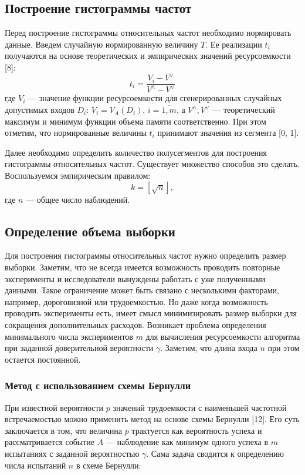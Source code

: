\subsection{Построение гистограммы частот}

Перед построение гистограммы относительных частот необходимо нормировать данные. Введем случайную нормированную величину $T$. Ее реализации $t_i$ получаются на основе теоретических и эмпирических значений ресурсоемкости [8]:
$$t_i = \frac{V_i - V^{\vee}}{V^{\wedge} - V^{\vee}}$$
где $V_i$ — значение функции ресурсоемкости для сгенерированных случайных допустимых входов $D_i$: $V_i = V_A(D_i)$, $i = \overline{1, m}$, а $V^{\wedge}, V^{\vee}$ — теоретический максимум и минимум функции объема памяти соответственно. При этом отметим, что
нормированные величины $t_i$ принимают значения из сегмента [0, 1].

Далее необходимо определить количество полусегментов для построения гистограммы относительных частот. Существует множество способов это сделать. Воспользуемся эмпирическим правилом:
$$k = [\sqrt{n}],$$
где $n$ — общее число наблюдений.

\subsection{Определение объема выборки}

Для построения гистограммы относительных частот нужно определить размер выборки. Заметим, что не всегда имеется возможность проводить повторные эксперименты и исследователи вынуждены работать с уже полученными данными. Такое ограничение может быть связано с несколькими факторами, например, дороговизной или трудоемкостью. Но даже когда возможность проводить эксперименты есть, имеет смысл минимизировать размер выборки для сокращения дополнительных расходов. Возникает проблема определения минимального числа экспериментов $m$ для вычисления ресурсоемкости алгоритма при заданной доверительной вероятности $\gamma$. Заметим, что длина входа $n$ при этом остается постоянной.

\subsubsection{Метод с использованием схемы Бернулли}
При известной вероятности $p$ значений трудоемкости с наименьшей
частотной встречаемостью можно применить метод на основе схемы Бернулли [12]. Его суть заключается в том, что величина $p$ трактуется как
вероятность успеха и рассматривается событие $A$ — наблюдение как минимум одного успеха в $m$ испытаниях с заданной вероятностью $\gamma$. Сама
задача сводится к определению числа испытаний $n$ в схеме Бернулли:

